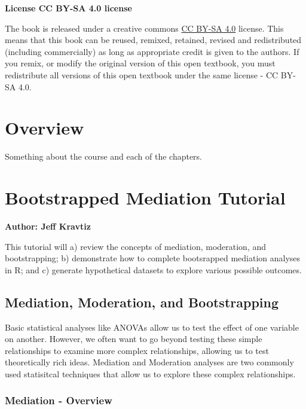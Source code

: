 \documentclass[]{book}
\begin{document}
\textbf{License CC BY-SA 4.0 license}

The book is released under a creative commons \href{https://creativecommons.org/licenses/by-sa/4.0/}{CC BY-SA 4.0} license. This means that this book can be reused, remixed, retained, revised and redistributed (including commercially) as long as appropriate credit is given to the authors. If you remix, or modify the original version of this open textbook, you must redistribute all versions of this open textbook under the same license - CC BY-SA 4.0.

\hypertarget{overview}{%
\chapter{Overview}\label{overview}}

Something about the course and each of the chapters.

\hypertarget{bootstrapped-mediation-tutorial}{%
\chapter{Bootstrapped Mediation Tutorial}\label{bootstrapped-mediation-tutorial}}

\textbf{Author: Jeff Kravtiz}

This tutorial will a) review the concepts of mediation, moderation, and bootstrapping; b) demonstrate how to complete bootsrapped mediation analyses in R; and c) generate hypothetical datasets to explore various possible outcomes.

\hypertarget{mediation-moderation-and-bootstrapping}{%
\section{Mediation, Moderation, and Bootstrapping}\label{mediation-moderation-and-bootstrapping}}

Basic statistical analyses like ANOVAs allow us to test the effect of one variable on another. However, we often want to go beyond testing these simple relationships to examine more complex relationships, allowing us to test theoretically rich ideas. Mediation and Moderation analyses are two commonly used statisitcal techniques that allow us to explore these complex relationships.

\hypertarget{mediation---overview}{%
\subsection{Mediation - Overview}\label{mediation---overview}}
\end{document}
